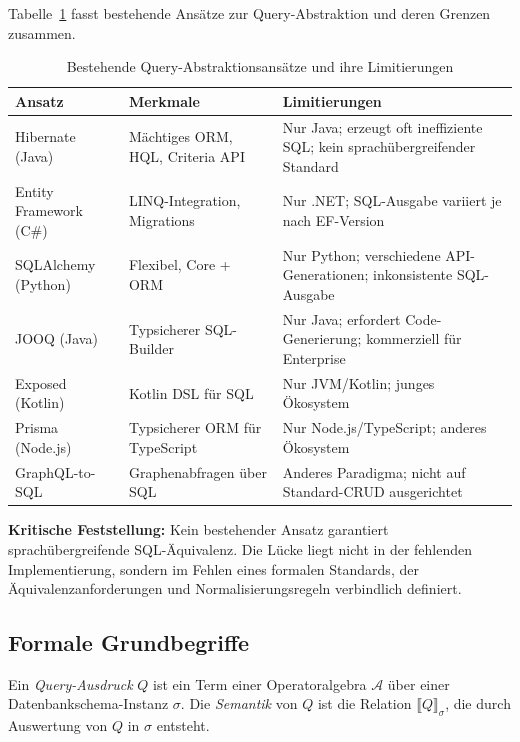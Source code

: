 Tabelle~\ref{tab:bestehend} fasst bestehende Ansätze zur Query-Abstraktion
und deren Grenzen zusammen.

\begin{table}[H]
\centering
\caption{Bestehende Query-Abstraktionsansätze und ihre Limitierungen}
\label{tab:bestehend}
\renewcommand{\arraystretch}{1.3}
\begin{tabularx}{\textwidth}{lXX}
\toprule
\textbf{Ansatz} & \textbf{Merkmale} & \textbf{Limitierungen} \\
\midrule
Hibernate (Java)
  & Mächtiges ORM, HQL, Criteria API
  & Nur Java; erzeugt oft ineffiziente SQL; kein sprachübergreifender Standard \\
\hline
Entity Framework (C\#)
  & LINQ-Integration, Migrations
  & Nur .NET; SQL-Ausgabe variiert je nach EF-Version \\
\hline
SQLAlchemy (Python)
  & Flexibel, Core + ORM
  & Nur Python; verschiedene API-Generationen; inkonsistente SQL-Ausgabe \\
\hline
JOOQ (Java)
  & Typsicherer SQL-Builder
  & Nur Java; erfordert Code-Generierung; kommerziell für Enterprise \\
\hline
Exposed (Kotlin)
  & Kotlin DSL für SQL
  & Nur JVM/Kotlin; junges Ökosystem \\
\hline
Prisma (Node.js)
  & Typsicherer ORM für TypeScript
  & Nur Node.js/TypeScript; anderes Ökosystem \\
\hline
GraphQL-to-SQL
  & Graphenabfragen über SQL
  & Anderes Paradigma; nicht auf Standard-CRUD ausgerichtet \\
\bottomrule
\end{tabularx}
\end{table}

\begin{warningbox}
\textbf{Kritische Feststellung:}
Kein bestehender Ansatz garantiert sprachübergreifende SQL-Äquivalenz.
Die Lücke liegt nicht in der fehlenden Implementierung, sondern im Fehlen
eines formalen Standards, der Äquivalenzanforderungen und
Normalisierungsregeln verbindlich definiert.
\end{warningbox}

\subsection{Formale Grundbegriffe}
\label{subsec:formale_grundbegriffe}

\begin{definition}
\label{def:query_expr}
Ein \emph{Query-Ausdruck} $Q$ ist ein Term einer Operatoralgebra $\mathcal{A}$
über einer Datenbankschema-Instanz $\sigma$. Die \emph{Semantik} von $Q$ ist
die Relation $\llbracket Q \rrbracket_\sigma$, die durch Auswertung von $Q$
in $\sigma$ entsteht.
\end{definition}

